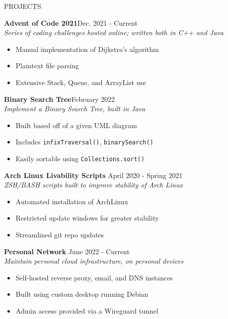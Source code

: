 \documentclass[UTF-8]{resume} \usepackage{multirow}
\begin{document}
\begin{rSection}{PROJECTS}
	\vspace{-1.5em}
	\item \textbf{Advent of Code 2021}\hfill {Dec. 2021 - Current}\\
	\emph{Series of coding challenges hosted online; written both in C++ and Java}
	\begin{itemize}
		\itemsep -6pt {}
		\item Manual implementation of Dijkstra's algorithm
		\item Plaintext file parsing
		\item Extensive Stack, Queue, and ArrayList use
	\end{itemize}
	\item \textbf{Binary Search Tree}\hfill {February 2022} \\
	\emph{ Implement a Binary Search Tree, built in Java}
	\begin{itemize}
		\itemsep -6pt {}
		\item Built based off of a given UML diagram
		\item Includes \verb|infixTraversal()|, \verb|binarySearch()|
		\item Easily sortable using \verb|Collections.sort()|
	\end{itemize}
	\item \textbf{Arch Linux Livability Scripts} \hfill {April 2020 - Spring 2021}\\
	\emph{ZSH/BASH scripts built to improve stability of Arch Linux}
	\begin{itemize}
		\itemsep -6pt {}
		\item Automated installation of ArchLinux
		\item Restricted update windows for greater stability
		\item Streamlined git repo updates
	\end{itemize}
	\item \textbf{Personal Network} \hfill{June 2022 - Current}\\
	\emph{Maintain personal cloud infrastructure, on personal devices}
	\begin{itemize}
		\itemsep -6pt {}
		\item Self-hosted reverse proxy, email, and DNS instances
		\item Built using custom desktop running Debian
		\item Admin access provided via a Wireguard tunnel
	\end{itemize}
\end{rSection}
\end{document}
